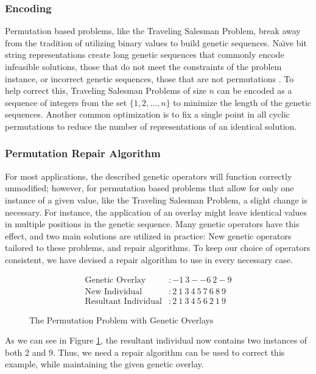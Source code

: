 \subsubsection*{Encoding}
Permutation based problems, like the Traveling Salesman Problem, break away from the tradition of utilizing binary values to build genetic sequences. Na\"{\i}ve bit string representations create long genetic sequences that commonly encode infeasible solutions, those that do not meet the constraints of the problem instance, or incorrect genetic sequences, those that are not permutations \cite{Potvin96}. To help correct this, Traveling Salesman Problems of size $n$ can be encoded as a sequence of integers from the set $\{1, 2, \ldots, n\}$ to minimize the length of the genetic sequences. Another common optimization is to fix a single point in all cyclic permutations to reduce the number of representations of an identical solution. 

\subsubsection*{Permutation Repair Algorithm}
For most applications, the described genetic operators will function correctly unmodified; however, for permutation based problems that allow for only one instance of a given value, like the Traveling Salesman Problem, a slight change is necessary. For instance, the application of an overlay might leave identical values in multiple positions in the genetic sequence. Many genetic operators have this effect, and two main solutions are utilized in practice: New genetic operators tailored to these problems, and repair algorithms\cite{Larranaga99}. To keep our choice of operators consistent, we have devised a repair algorithm to use in every necessary case.
\begin{figure}[h!]
\centering 
\begin{align*}
\text{Genetic Overlay} &:   -1~3--6~2-9				\\
\text{New Individual} &: 2~1~3~4~5~7~6~8~9			\\		
\text{Resultant Individual} &: 2~1~3~4~5~6~2~1~9
\end{align*}
\caption{The Permutation Problem with Genetic Overlays}
\label{PRA-Fig}
\end{figure}

As we can see in Figure \ref{PRA-Fig}, the resultant individual now contains two instances of both 2 and 9. Thus, we need a repair algorithm can be used to correct this example, while maintaining the given genetic overlay. 

